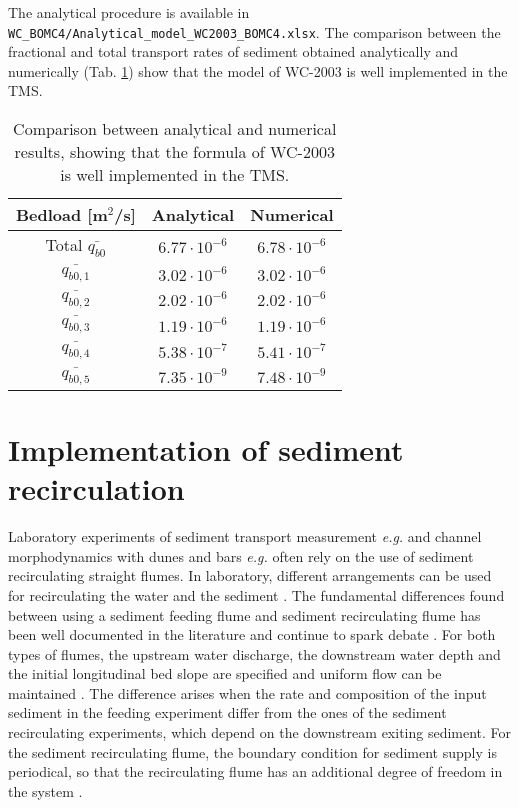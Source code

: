 The analytical procedure is available in \texttt{WC\_BOMC4/Analytical\_model\_WC2003\_BOMC4.xlsx}. The comparison between the fractional and total transport rates of sediment obtained analytically and numerically (Tab. \ref{tab:WC2003}) show that the model of WC-2003 is well implemented in the TMS.
      
\begin{table}[h!]
\caption[]{\centering Comparison between analytical and numerical results, showing that the formula of WC-2003 is well implemented in the TMS.}
\label{tab:WC2003}
\centering
\begin{tabular}{ | c || c | c |}
\hline
   Bedload [m$^2$/s] & Analytical & Numerical \\\hline\hline
   Total  $\bar{q_{b0}}$ & $6.77\cdot10^{-6}$ & $6.78\cdot10^{-6}$ \\\hline
   $\bar{q_{b0,1}}$ & $3.02\cdot10^{-6}$ & $3.02\cdot10^{-6}$ \\
   $\bar{q_{b0,2}}$ & $2.02\cdot10^{-6}$ & $2.02\cdot10^{-6}$ \\
   $\bar{q_{b0,3}}$ & $1.19\cdot10^{-6}$ & $1.19\cdot10^{-6}$ \\
   $\bar{q_{b0,4}}$ & $5.38\cdot10^{-7}$ & $5.41\cdot10^{-7}$ \\
   $\bar{q_{b0,5}}$ & $7.35\cdot10^{-9}$ & $7.48\cdot10^{-9}$ \\ \hline
\end{tabular}
\end{table}

\section{Implementation of sediment recirculation}
Laboratory experiments of sediment transport measurement {\it e.g.} \cite{Parker1993,Wilcock1993,Wilcock2003} and channel morphodynamics with dunes and bars {\it e.g.} \cite{Lanzoni2000a,Lanzoni2000b,Kleinhans2004,Crosato2012} often rely on the use of sediment recirculating straight flumes. In laboratory, different arrangements can be used for recirculating the water and the sediment \cite{Southard2006}. The fundamental differences found between using a sediment feeding flume and sediment recirculating flume has been well documented in the literature \cite{Wilcock1993,Parker1993,Wilcock2003,Kleinhans2004} and continue to spark debate \cite{Bettess1995}.
For both types of flumes, the upstream water discharge, the downstream water depth and the initial longitudinal bed slope are specified and uniform flow can be maintained \cite{Kleinhans2004}. The difference arises when the rate and composition of the input sediment in the feeding experiment differ from the ones of the sediment recirculating experiments, which depend on the downstream exiting sediment. For the sediment recirculating flume, the boundary condition for sediment supply is periodical, so that the recirculating flume has an additional degree of freedom in the system \cite{Kleinhans2004}.

